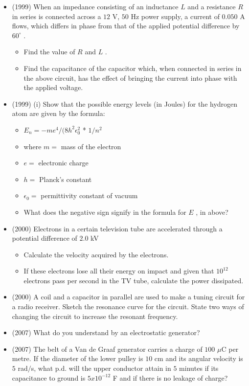\documentclass{article}
\begin{document}
\begin{itemize}
\item (1999)  When an impedance consisting of an inductance $ L$ and a resistance $ R$ in series is connected across a $ 12$ V, $ 50$ Hz power supply, a current of $ 0.050$ A flows, which differs in phase from that of the applied potential difference by $ 60^{\circ}$ .\begin{itemize}
\item Find the value of $ R$ and $ L$ .
\item Find the capacitance of the capacitor which, when connected in series in the above circuit, has the effect of bringing the current into phase with the applied voltage.
\end{itemize}
\item (1999)  (i) Show that the possible energy levels (in Joules) for the hydrogen atom are given by the formula:\begin{itemize}
\item $ E_{n}=-me^{4}/(8h^{2}\epsilon _{0}^{2}$ * $ 1/n^{2}$
\item where $ m=$ mass of the electron
\item $ e=$ electronic charge
\item $ h=$ Planck's constant
\item $ \epsilon _{0}=$ permittivity constant of vacuum
\item What does the negative sign signify in the formula for $ E$ , in above?
\end{itemize}
\item (2000)  Electrons in a certain television tube are accelerated through a potential difference of $ 2.0$ kV\begin{itemize}
\item Calculate the velocity acquired by the electrons.
\item If these electrons lose all their energy on impact and given that $ 10^{12}$ electrons pass per second in the TV tube, calculate the power dissipated.
\end{itemize}
\item (2000)  A coil and a capacitor in parallel are used to make a tuning circuit for a radio receiver. Sketch the resonance curve for the circuit. State two ways of changing the circuit to increase the resonant frequency.
\item (2007)  What do you understand by an electrostatic generator?
\item (2007)  The belt of a Van de Graaf generator carries a charge of $ 100$ $\mu$C per metre.  If the diameter of the lower pulley is $ 10$ cm and its angular velocity is $ 5$ rad$/$s, what p.d. will the upper conductor attain in $ 5$ minutes if its capacitance to ground is $ 5x10^{-12}$ F and if there is no leakage of charge?

\end{itemize}
\end{document}
